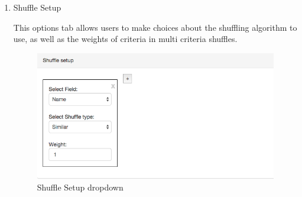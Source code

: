 \begin{enumerate}
\item Shuffle Setup\par
This options tab allows users to make choices about the shuffling algorithm to use, as well as the weights of criteria in multi criteria shuffles.\par
 \begin{figure}[H] 
	\centering
	\includegraphics[width=13cm]{./graphics/ShuffleSetup.jpg}\par
	\caption{Shuffle Setup dropdown}
\end{figure}


\end{enumerate}
